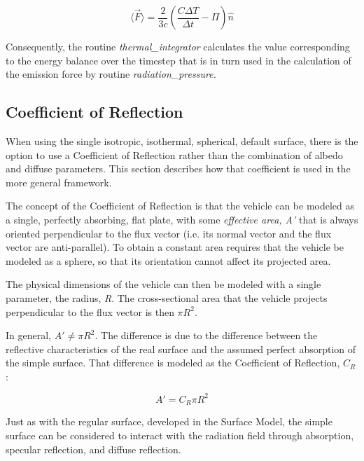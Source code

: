       \begin{equation}
        \langle \vec F \rangle = \frac{2}{3c}
        \left( \frac{C \Delta T}{\Delta t} -\Pi \right) \hat n
      \end{equation}


      Consequently, the routine
      \textit{thermal\_integrator} calculates the value corresponding to the
      energy balance over the timestep that is in turn used in the
      calculation of the emission force by routine
      \textit{radiation\_pressure.}



\subsection{Coefficient of Reflection}\label{sec:coefficientofreflection}

When using the single isotropic, isothermal, spherical, default surface,
there is the option to use a Coefficient of Reflection rather than the
combination of albedo and diffuse parameters.  This section describes how
that coefficient is used in the more general framework.

The concept of the Coefficient of Reflection is that the vehicle can be
modeled as a single, perfectly absorbing, flat plate, with some
\textit{effective area, A'} that is always oriented perpendicular to the flux
vector (i.e. its normal vector and the flux vector are anti-parallel).  To
obtain a constant area requires that the vehicle be modeled as a sphere,
so that its orientation cannot affect its projected area.

The physical dimensions of the vehicle can then be modeled with a single
parameter, the radius, \textit{R}.  The cross-sectional area that the
vehicle projects perpendicular to the flux vector is then $\pi R^2$.

In general, $A' \neq \pi R^2$.  The difference is due to the difference
between the reflective characteristics of the real surface and the assumed
perfect absorption of the simple surface.  That difference is modeled as
the Coefficient of Reflection, $C_R$:

\begin{equation*}
A' = C_R \pi R^2
\end{equation*}

Just as with the regular surface, developed in the Surface Model, the
simple surface can be considered to interact with the radiation field
through absorption, specular reflection, and diffuse reflection.

